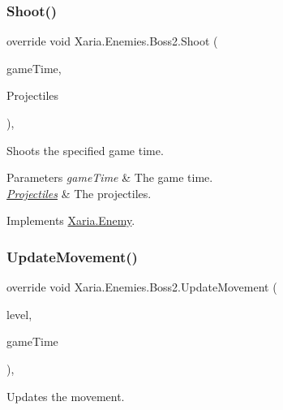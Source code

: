 \subsubsection{\texorpdfstring{Shoot()}{Shoot()}}
{\footnotesize\ttfamily override void Xaria.\+Enemies.\+Boss2.\+Shoot (\begin{DoxyParamCaption}\item[{Game\+Time}]{game\+Time,  }\item[{ref List$<$ \hyperlink{classXaria_1_1Projectile}{Projectile} $>$}]{Projectiles }\end{DoxyParamCaption})\hspace{0.3cm}{\ttfamily [inline]}, {\ttfamily [virtual]}}



Shoots the specified game time. 


\begin{DoxyParams}{Parameters}
{\em game\+Time} & The game time.\\
\hline
{\em \hyperlink{namespaceXaria_1_1Projectiles}{Projectiles}} & The projectiles.\\
\hline
\end{DoxyParams}


Implements \hyperlink{classXaria_1_1Enemy_a229b595e96e1429a9e9b1d9816d4370b}{Xaria.\+Enemy}.

\mbox{\label{classXaria_1_1Enemies_1_1Boss2_a6121cd1be6449c71e579ab4d59398a9a}} 
\subsubsection{\texorpdfstring{Update\+Movement()}{UpdateMovement()}}
{\footnotesize\ttfamily override void Xaria.\+Enemies.\+Boss2.\+Update\+Movement (\begin{DoxyParamCaption}\item[{\hyperlink{classXaria_1_1Level}{Level}}]{level,  }\item[{Game\+Time}]{game\+Time }\end{DoxyParamCaption})\hspace{0.3cm}{\ttfamily [inline]}, {\ttfamily [virtual]}}



Updates the movement. 



